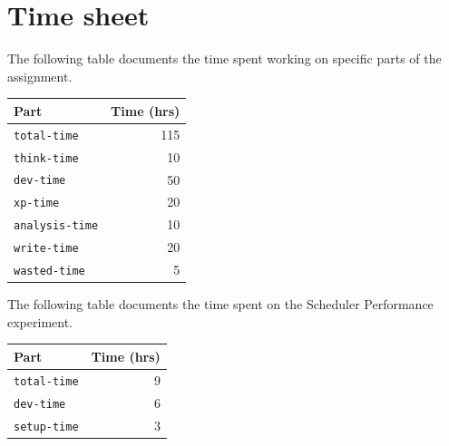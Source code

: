 \documentclass{acm_proc_article-sp}
\begin{document}
{}


\newpage
\appendix
\section{Time sheet}
\label{app:a}

The following table documents the time spent working on specific parts of the assignment.

\begin{tabular}{ | l | r | }
	\hline
	Part & Time (hrs) \\ \hline \hline
	\texttt{total-time} & 115\\ \hline
	\texttt{think-time} & 10\\ \hline
	\texttt{dev-time} & 50\\ \hline
	\texttt{xp-time} & 20\\ \hline
	\texttt{analysis-time} & 10\\ \hline
	\texttt{write-time} & 20\\ \hline
	\texttt{wasted-time} & 5\\ \hline
\end{tabular}

The following table documents the time spent on the Scheduler Performance experiment.

\begin{tabular}{ | l | r | }
	\hline
	Part & Time (hrs) \\ \hline \hline
	\texttt{total-time} & 9\\ \hline
	\texttt{dev-time} & 6\\ \hline
	\texttt{setup-time} & 3\\ \hline
\end{tabular}
\end{document}
